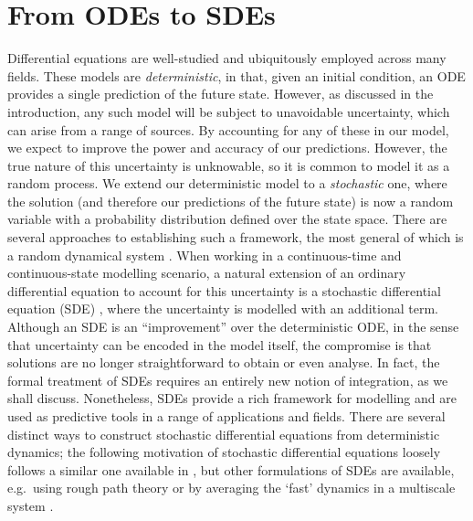 \section{From ODEs to SDEs}
Differential equations are well-studied and ubiquitously employed across many fields.
These models are \emph{deterministic}, in that, given an initial condition, an ODE provides a single prediction of the future state.
However, as discussed in the introduction, any such model will be subject to unavoidable uncertainty, which can arise from a range of sources.
By accounting for any of these in our model, we expect to improve the power and accuracy of our predictions.
However, the true nature of this uncertainty is unknowable, so it is common to model it as a random process.
We extend our deterministic model to a \emph{stochastic} one, where the solution (and therefore our predictions of the future state) is now a random variable with a probability distribution defined over the state space.
There are several approaches to establishing such a framework, the most general of which is a random dynamical system \citep{Arnold_1998_RandomDynamicalSystems,NeckelRupp_2013_RandomDifferentialEquations}.
When working in a continuous-time and continuous-state modelling scenario, a natural extension of an ordinary differential equation to account for this uncertainty is a stochastic differential equation (SDE) \citep{Oksendal_2003_StochasticDifferentialEquations,KallianpurSundar_2014_StochasticAnalysisDiffusion}, where the uncertainty is modelled with an additional term.
Although an SDE is an ``improvement'' over the deterministic ODE, in the sense that uncertainty can be encoded in the model itself, the compromise is that solutions are no longer straightforward to obtain or even analyse.
In fact, the formal treatment of SDEs requires an entirely new notion of integration, as we shall discuss.
Nonetheless, SDEs provide a rich framework for modelling and are used as predictive tools in a range of applications and fields. %
There are several distinct ways to construct stochastic differential equations from deterministic dynamics; the following motivation of stochastic differential equations loosely follows a similar one available in \citet{Oksendal_2003_StochasticDifferentialEquations}, but other formulations of SDEs are available, e.g.\ using rough path theory \citep{FrizVictoir_2010_MultidimensionalStochasticProcesses} or by averaging the `fast' dynamics in a multiscale system \citep{MelbourneStuart_2011_NoteDiffusionLimits,GottwaldMelbourne_2013_HomogenizationDeterministicMaps,PavliotisStuart_2008_MultiscaleMethods}.


